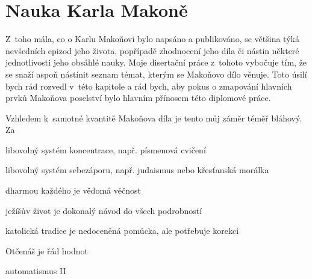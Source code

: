 \chapter{Nauka Karla Makoně}

Z~toho mála, co o Karlu Makoňovi bylo napsáno a publikováno, se většina týká
nevšedních epizod jeho života, popřípadě zhodnocení jeho díla či nástin některé
jednotlivosti jeho obsáhlé nauky. Moje disertační práce z~tohoto vybočuje tím,
že se snaží aspoň nástínit seznam témat, kterým se Makoňovo dílo věnuje. Toto
úsilí bych rád rozvedl v~této kapitole a rád bych, aby pokus o zmapování
hlavních prvků Makoňova poselství bylo hlavním přínosem této diplomové práce.

Vzhledem k~samotné kvantitě Makoňova díla je tento můj záměr téměř bláhový. Za 

libovolný systém koncentrace, např. písmenová cvičení

libovolný systém sebezáporu, např. judaismus nebo křesťanská morálka

dharmou každého je vědomá věčnost

ježíšův život je dokonalý návod do všech podrobností

katolická tradice je nedoceněná pomůcka, ale potřebuje korekci

Otčenáš je řád hodnot

automatismus II
